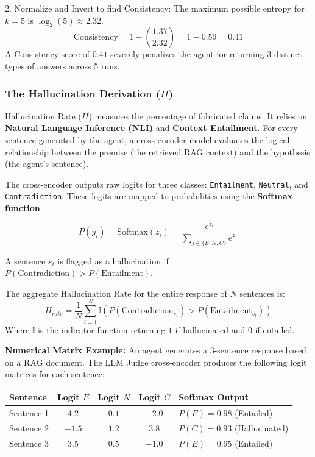 \documentclass[11pt,a4paper]{article}
\begin{document}
2. Normalize and Invert to find Consistency:
The maximum possible entropy for $k=5$ is $\log_2(5) \approx 2.32$.
\[ \text{Consistency} = 1 - \left( \frac{1.37}{2.32} \right) = 1 - 0.59 = \mathbf{0.41} \]
A Consistency score of $0.41$ severely penalizes the agent for returning 3 distinct types of answers across 5 runs.

\newpage

\subsubsection{The Hallucination Derivation ($H$)}

Hallucination Rate ($H$) measures the percentage of fabricated claims. It relies on \textbf{Natural Language Inference (NLI)} and \textbf{Context Entailment}. For every sentence generated by the agent, a cross-encoder model evaluates the logical relationship between the premise (the retrieved RAG context) and the hypothesis (the agent's sentence).

The cross-encoder outputs raw logits for three classes: \texttt{Entailment}, \texttt{Neutral}, and \texttt{Contradiction}. These logits are mapped to probabilities using the \textbf{Softmax function}.

\begin{tcolorbox}[colback=white, colframe=dpiblue, title=\textbf{NLI Softmax Equation}]
\[ P(y_i) = \text{Softmax}(z_i) = \frac{e^{z_i}}{\sum_{j \in \{E, N, C\}} e^{z_j}} \]
\end{tcolorbox}

A sentence $s_i$ is flagged as a hallucination if $P(\text{Contradiction}) > P(\text{Entailment})$.

The aggregate Hallucination Rate for the entire response of $N$ sentences is:
\[ H_{rate} = \frac{1}{N} \sum_{i=1}^{N} \mathbb{I}( P(\text{Contradiction}_{s_i}) > P(\text{Entailment}_{s_i}) ) \]
Where $\mathbb{I}$ is the indicator function returning $1$ if hallucinated and $0$ if entailed.

\textbf{Numerical Matrix Example:}
An agent generates a 3-sentence response based on a RAG document. The LLM Judge cross-encoder produces the following logit matrices for each sentence:

\vspace{0.3cm}
\begin{center}
\renewcommand{\arraystretch}{1.2}
\begin{tabular}{l c c c l}
\toprule
\textbf{Sentence} & \textbf{Logit $E$} & \textbf{Logit $N$} & \textbf{Logit $C$} & \textbf{Softmax Output} \\
\midrule
Sentence 1 & $4.2$ & $0.1$ & $-2.0$ & $P(E)=0.98$ (Entailed) \\
Sentence 2 & $-1.5$ & $1.2$ & $3.8$ & $P(C)=0.93$ (Hallucinated) \\
Sentence 3 & $3.5$ & $0.5$ & $-1.0$ & $P(E)=0.95$ (Entailed) \\
\bottomrule
\end{tabular}
\end{center}
\vspace{0.3cm}
\end{document}
